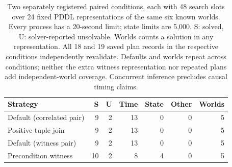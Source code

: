 \begin{table}[t]
\centering
\small
\begin{tabular}{lrrrrrr}
\toprule
Strategy & S & U & Time & State & Other & Worlds \\
\midrule
Default (correlated pair) & 9 & 2 & 13 & 0 & 0 & 5 \\
Positive-tuple join & 9 & 2 & 13 & 0 & 0 & 5 \\
Default (witness pair) & 9 & 2 & 13 & 0 & 0 & 5 \\
Precondition witness & 10 & 2 & 8 & 4 & 0 & 5 \\
\bottomrule
\end{tabular}
\caption{Two separately registered paired conditions, each with 48 search slots over 24 fixed PDDL representations of the same six known worlds. Every process has a 20-second limit; state limits are 5,000. S: solved, U: solver-reported unsolvable. Worlds counts a solution in any representation. All 18 and 19 saved plan records in the respective conditions independently revalidate. Defaults and worlds repeat across conditions; neither the extra witness representation nor repeated plans add independent-world coverage. Concurrent inference precludes causal timing claims.}
\label{tab:execution-diagnostics-oct24}
\end{table}
